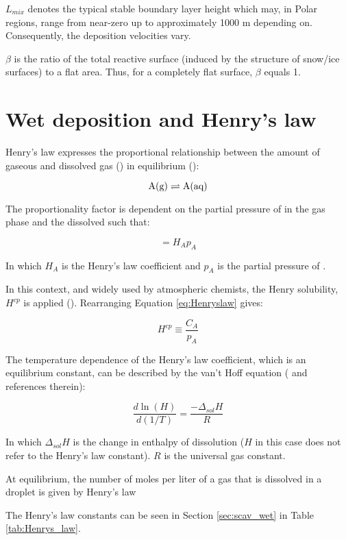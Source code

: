 $L_{mix}$ denotes the typical stable boundary layer height which may, in Polar regions, range from near-zero up to approximately 1000 m depending on. Consequently, the deposition velocities vary.

\medskip

$\beta$ is the ratio of the total reactive surface (induced by the structure of snow/ice surfaces) to a flat area. Thus, for a completely flat surface, $\beta$ equals 1. 





\section{Wet deposition and Henry's law}\label{sec:wet_dep_henrys_law}

Henry's law expresses the proportional relationship between the amount of gaseous and dissolved gas () in equilibrium (\cite{SeinfeldSpyros}): 

\begin{equation*}
    \mathrm{A(g)} \rightleftharpoons \mathrm{A(aq)}
\end{equation*}

The proportionality factor is dependent on the partial pressure of  in the gas phase and the dissolved  such that: 

\begin{equation}
    [\chem{A(aq)}] = H_Ap_A
    \label{eq:Henryslaw}
\end{equation}

In which $H_A$ is the Henry's law coefficient and $p_A$ is the partial pressure of . 

\medskip

In this context, and widely used by atmospheric chemists, the Henry solubility, $H^{cp}$ is applied (\cite{Sander2015}). Rearranging Equation \ref{eq:Henryslaw} gives: 

\begin{equation}
    H^{cp} \equiv \frac{C_A}{p_A}
    \label{eq:HenrySol}
\end{equation}

The temperature dependence of the Henry's law coefficient, which is an equilibrium constant, can be described by the van't Hoff equation (\cite{Sander2015} and references therein): 

\begin{equation*}
    \frac{d\ln(H)}{d(1/T)} = \frac{-\Delta_{sol}H}{R}
    \label{eq:vantHoff}
\end{equation*}

In which $\Delta_{sol}H$ is the change in enthalpy of dissolution ($H$ in this case does not refer to the Henry's law constant). $R$ is the universal gas constant. 


At equilibrium, the number of moles per liter of a gas that is dissolved in a droplet is given by Henry's law


The Henry's law constants can be seen in Section \ref{sec:scav_wet} in Table \ref{tab:Henrys_law}. 

